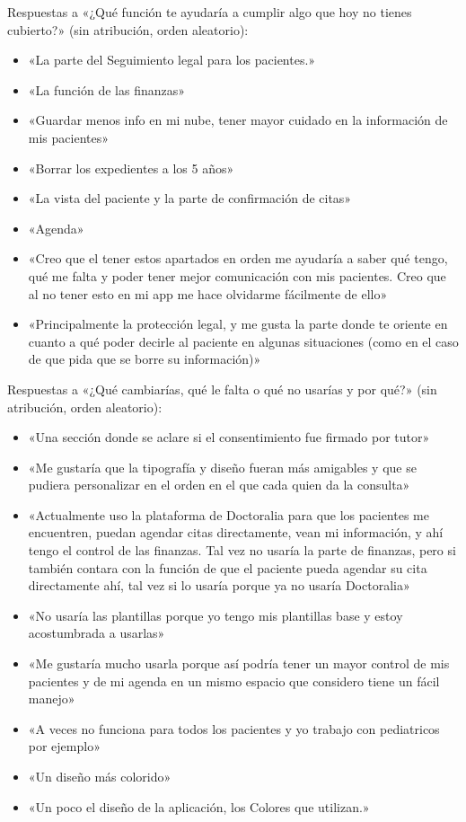 \documentclass[12pt, a4paper]{article}
\begin{document}
Respuestas a «¿Qué función te ayudaría a cumplir algo que hoy no tienes cubierto?» (sin atribución, orden aleatorio):
\begin{itemize}[leftmargin=*,itemsep=0pt]
  \item «La parte del Seguimiento legal para los pacientes.»
  \item «La función de las finanzas»
  \item «Guardar menos info en mi nube, tener mayor cuidado en la información de mis pacientes»
  \item «Borrar los expedientes a los 5 años»
  \item «La vista del paciente y la parte de confirmación de citas»
  \item «Agenda»
  \item «Creo que el tener estos apartados en orden me ayudaría a saber qué tengo, qué me falta y poder tener mejor comunicación con mis pacientes. Creo que al no tener esto en mi app me hace olvidarme fácilmente de ello»
  \item «Principalmente la protección legal, y me gusta la parte donde te oriente en cuanto a qué poder decirle al paciente en algunas situaciones (como en el caso de que pida que se borre su información)»
\end{itemize}

Respuestas a «¿Qué cambiarías, qué le falta o qué no usarías y por qué?» (sin atribución, orden aleatorio):
\begin{itemize}[leftmargin=*,itemsep=0pt]
  \item «Una sección donde se aclare si el consentimiento fue firmado por tutor»
  \item «Me gustaría que la tipografía y diseño fueran más amigables y que se pudiera personalizar en el orden en el que cada quien da la consulta»
  \item «Actualmente uso la plataforma de Doctoralia para que los pacientes me encuentren, puedan agendar citas directamente, vean mi información, y ahí tengo el control de las finanzas. Tal vez no usaría la parte de finanzas, pero si también contara con la función de que el paciente pueda agendar su cita directamente ahí, tal vez si lo usaría porque ya no usaría Doctoralia»
  \item «No usaría las plantillas porque yo tengo mis plantillas base y estoy acostumbrada a usarlas»
  \item «Me gustaría mucho usarla porque así podría tener un mayor control de mis pacientes y de mi agenda en un mismo espacio que considero tiene un fácil manejo»
  \item «A veces no funciona para todos los pacientes y yo trabajo con pediatricos por ejemplo»
  \item «Un diseño más colorido»
  \item «Un poco el diseño de la aplicación, los Colores que utilizan.»
\end{itemize}
\end{document}
